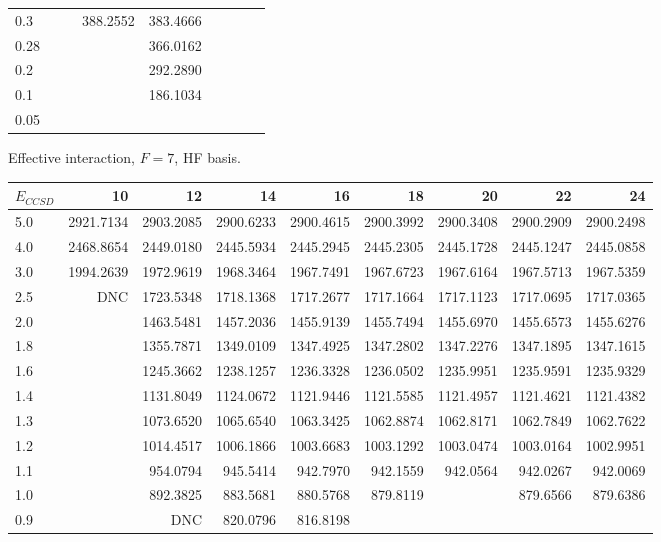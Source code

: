\begin{landscape}
\begin{table}
\begin{center}
\begin{tabular}{l|rrrrrrrr}
0.3 &			&			&  388.2552 &  383.4666  \\ 
0.28 &			&			&			&  366.0162  \\ 
0.2 &			&			&			&  292.2890  \\ 
0.1 &			&			&			&  186.1034  \\ 
0.05 & \\
\hline \hline
\end{tabular}
\end{center}
\end{table}
\begin{table}
\begin{center}
Effective interaction, $F=7$, HF basis.\\
\begin{tabular}{l|rrrrrrrr}
\hline 
$E_{CCSD}$ & 10 & 12 & 14 & 16 & 18 & 20 & 22 & 24 \\
\hline \hline
5.0 & 2921.7134 & 2903.2085 & 2900.6233 & 2900.4615 & 2900.3992 & 2900.3408 & 2900.2909 & 2900.2498 \\ 
4.0 & 2468.8654 & 2449.0180 & 2445.5934 & 2445.2945 & 2445.2305 & 2445.1728 & 2445.1247 & 2445.0858 \\ 
3.0 & 1994.2639 & 1972.9619 & 1968.3464 & 1967.7491 & 1967.6723 & 1967.6164 & 1967.5713 & 1967.5359 \\ 
2.5 &       DNC & 1723.5348 & 1718.1368 & 1717.2677 & 1717.1664 & 1717.1123 & 1717.0695 & 1717.0365 \\ 
2.0 &			& 1463.5481 & 1457.2036 & 1455.9139 & 1455.7494 & 1455.6970 & 1455.6573 & 1455.6276 \\ 
1.8 &			& 1355.7871 & 1349.0109 & 1347.4925 & 1347.2802 & 1347.2276 & 1347.1895 & 1347.1615 \\ 
1.6 &			& 1245.3662 & 1238.1257 & 1236.3328 & 1236.0502 & 1235.9951 & 1235.9591 & 1235.9329 \\ 
1.4 &			& 1131.8049 & 1124.0672 & 1121.9446 & 1121.5585 & 1121.4957 & 1121.4621 & 1121.4382 \\ 
1.3 &			& 1073.6520 & 1065.6540 & 1063.3425 & 1062.8874 & 1062.8171 & 1062.7849 & 1062.7622 \\ 
1.2 &			& 1014.4517 & 1006.1866 & 1003.6683 & 1003.1292 & 1003.0474 & 1003.0164 & 1002.9951 \\ 
1.1 &			&  954.0794 &  945.5414 &  942.7970 &  942.1559 & 942.0564  &  942.0267 &  942.0069 \\ 
1.0 &			&  892.3825 &  883.5681 &  880.5768 &  879.8119 &           &  879.6566 &  879.6386 \\ 
0.9 &			&  DNC      &  820.0796 &  816.8198 &  \\ 

\end{tabular}
\end{center}
\end{table}
\end{landscape}
